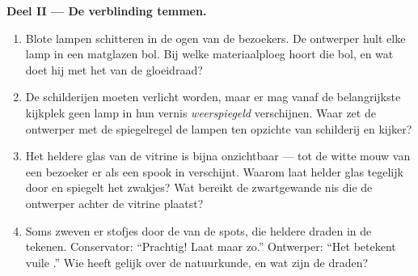 \begin{problem}
\medskip\noindent\textbf{Deel II --- De verblinding temmen.}
\begin{enumerate}[resume]
  \item Blote lampen schitteren in de ogen van de bezoekers. De
        ontwerper hult elke lamp in een matglazen bol. Bij welke
        materiaalploeg hoort die bol, en wat doet hij met het
         van de gloeidraad?
  \item De schilderijen moeten verlicht worden, maar er mag vanaf de
        belangrijkste kijkplek geen lamp in hun vernis
        \emph{weerspiegeld} verschijnen. Waar zet de ontwerper met de
        spiegelregel de lampen ten opzichte van schilderij en
        kijker?
  \item Het heldere glas van de vitrine is bijna onzichtbaar --- tot
        de witte mouw van een bezoeker er als een spook in
        verschijnt. Waarom laat helder glas tegelijk door en
        spiegelt het zwakjes? Wat bereikt de zwartgewande nis die de
        ontwerper achter de vitrine plaatst?
  \item Soms zweven er stofjes door de  van de spots, die
        heldere draden in de  tekenen. Conservator: ``Prachtig!
        Laat maar zo.'' Ontwerper: ``Het betekent vuile
        .'' Wie heeft gelijk over de natuurkunde, en wat zijn de
        draden?
\end{enumerate}


\end{problem}
